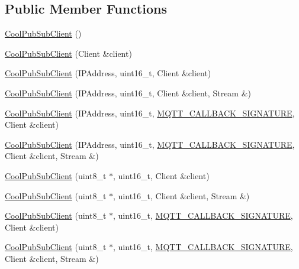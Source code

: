 \subsection*{Public Member Functions}
\begin{DoxyCompactItemize}
\item 
\hyperlink{class_cool_pub_sub_client_a2e54e36217bb0969b91b5dee9a27410f}{Cool\+Pub\+Sub\+Client} ()
\item 
\hyperlink{class_cool_pub_sub_client_a0563a12cb4e9339bf2605cfc655e717d}{Cool\+Pub\+Sub\+Client} (Client \&client)
\item 
\hyperlink{class_cool_pub_sub_client_a4548ad6f306f6181e337a86c0b21a89a}{Cool\+Pub\+Sub\+Client} (I\+P\+Address, uint16\+\_\+t, Client \&client)
\item 
\hyperlink{class_cool_pub_sub_client_af8b1aeb169366da52e3289bb6c238b6b}{Cool\+Pub\+Sub\+Client} (I\+P\+Address, uint16\+\_\+t, Client \&client, Stream \&)
\item 
\hyperlink{class_cool_pub_sub_client_a1743a9eeef19b3b6ff1db5be8df55a9c}{Cool\+Pub\+Sub\+Client} (I\+P\+Address, uint16\+\_\+t, \hyperlink{class_cool_pub_sub_client_a021ec75e9fbaf658370b8005ccfddc14}{M\+Q\+T\+T\+\_\+\+C\+A\+L\+L\+B\+A\+C\+K\+\_\+\+S\+I\+G\+N\+A\+T\+U\+RE}, Client \&client)
\item 
\hyperlink{class_cool_pub_sub_client_a0797679d710bf2b1aa802107bdb1a2fe}{Cool\+Pub\+Sub\+Client} (I\+P\+Address, uint16\+\_\+t, \hyperlink{class_cool_pub_sub_client_a021ec75e9fbaf658370b8005ccfddc14}{M\+Q\+T\+T\+\_\+\+C\+A\+L\+L\+B\+A\+C\+K\+\_\+\+S\+I\+G\+N\+A\+T\+U\+RE}, Client \&client, Stream \&)
\item 
\hyperlink{class_cool_pub_sub_client_a15e4dd41ebda943c377539086f70469d}{Cool\+Pub\+Sub\+Client} (uint8\+\_\+t $\ast$, uint16\+\_\+t, Client \&client)
\item 
\hyperlink{class_cool_pub_sub_client_a3e7d7fa4b55e36f0ac8912335993d650}{Cool\+Pub\+Sub\+Client} (uint8\+\_\+t $\ast$, uint16\+\_\+t, Client \&client, Stream \&)
\item 
\hyperlink{class_cool_pub_sub_client_afc703702b40ba925377d0b9cd401319e}{Cool\+Pub\+Sub\+Client} (uint8\+\_\+t $\ast$, uint16\+\_\+t, \hyperlink{class_cool_pub_sub_client_a021ec75e9fbaf658370b8005ccfddc14}{M\+Q\+T\+T\+\_\+\+C\+A\+L\+L\+B\+A\+C\+K\+\_\+\+S\+I\+G\+N\+A\+T\+U\+RE}, Client \&client)
\item 
\hyperlink{class_cool_pub_sub_client_a08309a2cf058099fa5c96c198f777647}{Cool\+Pub\+Sub\+Client} (uint8\+\_\+t $\ast$, uint16\+\_\+t, \hyperlink{class_cool_pub_sub_client_a021ec75e9fbaf658370b8005ccfddc14}{M\+Q\+T\+T\+\_\+\+C\+A\+L\+L\+B\+A\+C\+K\+\_\+\+S\+I\+G\+N\+A\+T\+U\+RE}, Client \&client, Stream \&)

\end{DoxyCompactItemize}
